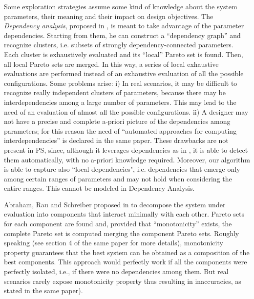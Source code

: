 Some exploration strategies assume some kind of knowledge about the
system parameters, their meaning and their impact on design
objectives.  The \emph{Dependency analysis}, proposed in
\cite{givargis_tvlsi02}, is meant to take advantage of the parameter
dependencies. Starting from them, he can construct a ``dependency graph''
and recognize clusters, i.e. subsets of strongly dependency-connected
parameters. Each cluster is exhaustively evaluated and its ``local''
Pareto set is found. Then, all local Pareto sets are merged. In this
way, a series of local exhaustive evaluations are performed instead of
an exhaustive evaluation of all the possible configurations. Some
problems arise: i) In real scenarios, it may be difficult to recognize
really independent clusters of parameters, because there may be
interdependencies among a large number of parameters. This may lead to
the need of an evaluation of almost all the possible configurations.
ii) A designer may not have a precise and complete a-priori picture of
the dependencies among parameters; for this reason the need of
``automated approaches for computing interdependencies'' is declared
in the same paper.  These drawbacks are not present in PS,
since, although it leverages dependencies as in
\cite{givargis_tvlsi02}, it is able to detect them automatically, with
no a-priori knowledge required. Moreover, our algorithm is able to
capture also ``local dependencies", i.e. dependencies that emerge only
among certain ranges of parameters and may not hold when considering
the entire ranges. This cannot be modeled in Dependency Analysis. 

Abraham, Rau and Schreiber proposed in \cite{santosh_hptr00} to decompose
the system under evaluation into components that interact minimally
with each other. Pareto sets for each component are found and, provided
that ``monotonicity'' exists, the complete Pareto set is computed
merging the component Pareto sets. Roughly speaking (see section 4
of the same paper for more details), monotonicity property guarantees
that the best system can be obtained as a composition of the best
components. This approach would perfectly work if all the components
were perfectly isolated, i.e., if there were no dependencies among
them. But real scenarios rarely expose monotonicity property thus resulting in inaccuracies, as stated in the same paper).

